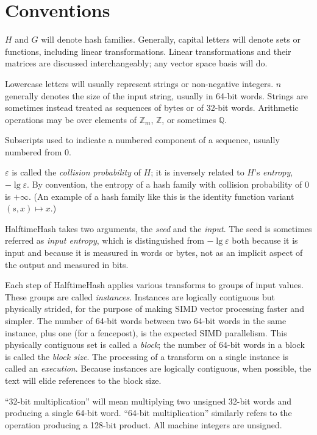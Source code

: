 \documentclass[sigconf, nonacm]{acmart}
\newcommand{\rats}{\mathbb{Q}}
\newcommand{\ints}{\mathbb{Z}}
\begin{document}
\section{Conventions}

$H$ and $G$ will denote hash families.
Generally, capital letters will denote sets or functions, including linear transformations.
Linear transformations and their matrices are discussed interchangeably; any vector space basis will do.

Lowercase letters will usually represent strings or non-negative integers.
$n$ generally denotes the size of the input string, usually in 64-bit words.
Strings are sometimes instead treated as sequences of bytes or of 32-bit words.
Arithmetic operations may be over elements of $\ints_m$, $\ints$, or sometimes $\rats$.

Subscripts used to indicate a numbered component of a sequence, usually numbered from 0.

$\varepsilon$ is called the {\em collision probability} of $H$; it is inversely related to $H$'s {\em entropy}, $-\lg \varepsilon$.
By convention, the entropy of a hash family with collision probability of $0$ is $+\infty$.
(An example of a hash family like this is the identity function variant $(s, x) \mapsto x$.)

HalftimeHash takes two arguments, the {\em seed} and the {\em input}.
The seed is sometimes referred as {\em input entropy}, which is distinguished from $-\lg \varepsilon$ both because it is input and because it is measured in words or bytes, not as an implicit aspect of the output and measured in bits.

Each step of HalftimeHash applies various transforms to groups of input values.
These groups are called {\em instances}.
Instances are logically contiguous but physically strided, for the purpose of making SIMD vector processing faster and simpler.
The number of 64-bit words between two 64-bit words in the same instance, plus one (for a fencepost), is the expected SIMD parallelism.
This physically contiguous set is called a {\em block}; the number of 64-bit words in a block is called the {\em block size}.
The processing of a transform on a single instance is called an {\em execution}.
Because instances are logically contiguous, when possible, the text will elide references to the block size.

``32-bit multiplication'' will mean multiplying two unsigned 32-bit words and producing a single 64-bit word.
``64-bit multiplication'' similarly refers to the operation producing a 128-bit product.
All machine integers are unsigned.
\end{document}
